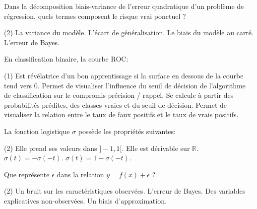\documentclass[solutions]{../cc}
\begin{document}
	\begin{question}
		Dans la décomposition biais-variance de l'erreur quadratique d'un problème de régression, quels termes composent le risque vrai ponctuel ?
		\begin{tasks}(2)
			\task La variance du modèle.
			\task L'écart de généralisation.
			\task Le biais du modèle au carré.
			\task L'erreur de Bayes.
		\end{tasks}
	\end{question}

	\begin{question}
		En classification binaire, la courbe ROC:
		\begin{tasks}(1)
			\task Est révélatrice d'un bon apprentissage si la surface en dessous de la courbe tend vers 0.
			\task Permet de visualiser l'influence du seuil de décision de l'algorithme de classification sur le compromis précision / rappel.
			\task Se calcule à partir des probabilités prédites, des classes vraies et du seuil de décision.
			\task Permet de visualiser la relation entre le taux de faux positifs et le taux de vrais positifs.
		\end{tasks}
	\end{question}

	\begin{question}
		La fonction logistique $\sigma$ possède les propriétés suivantes:
		\begin{tasks}(2)
			\task Elle prend ses valeurs dans $]-1, 1[$.
			\task Elle est dérivable sur $\mathbb{R}$.
			\task $\sigma(t) = -\sigma(-t)$.
			\task $\sigma(t) = 1 - \sigma(-t)$.
		\end{tasks}
	\end{question}

	\begin{question}
		Que représente $\epsilon$ dans la relation $y = f(x) + \epsilon$ ?
		\begin{tasks}(2)
			\task Un bruit sur les caractéristiques observées.
			\task L'erreur de Bayes.
			\task Des variables explicatives non-observées.
			\task Un biais d'approximation.
		\end{tasks}
	\end{question}
\end{document}
